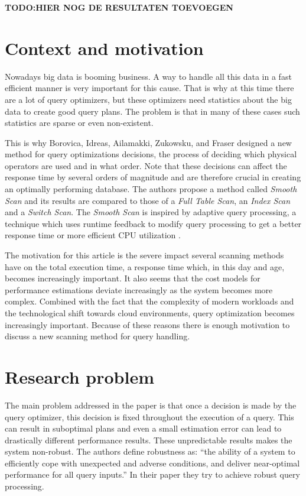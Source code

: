 \documentclass[a4paper,11pt,twoside]{article}
\begin{document}
\textbf{TODO:HIER NOG DE RESULTATEN TOEVOEGEN}

\newpage
\section{Context and motivation}
Nowadays big data is booming business. A way to handle all this data in a fast efficient manner is very important for this cause. That is why at this time there are a lot of query optimizers, but these optimizers need statistics about the big data to create good query plans. The problem is that in many of these cases such statistics are sparse or even non-existent.

This is why Borovica, Idreas, Ailamakki, Zukowsku, and Fraser \cite{smoothscan} designed a new method for query optimizations decisions, the process of deciding which physical operators are used and in what order. Note that these decisions can affect the response time by several orders of magnitude and are therefore crucial in creating an optimally performing database. The authors propose a method called \emph{Smooth Scan} and its results are compared to those of a \emph{Full Table Scan}, an \emph{Index Scan} and a \emph{Switch Scan}. The \emph{Smooth Scan} is inspired by adaptive query processing, a technique which uses runtime feedback to modify query processing to get a better response time or more efficient CPU utilization \cite{query}.

The motivation for this article is the severe impact several scanning methods have on the total execution time, a response time which, in this day and age, becomes increasingly important. It also seems that the cost models for performance estimations deviate increasingly as the system becomes more complex. Combined with the fact that the complexity of modern workloads and the technological shift towards cloud environments, query optimization becomes increasingly important. Because of these reasons there is enough motivation to discuss a new scanning method for query handling.

\section{Research problem}
The main problem addressed in the paper is that once a decision is made by the query optimizer, this decision is fixed throughout the execution of a query. This can result in suboptimal plans and even a small estimation error can lead to drastically different performance results. These unpredictable results makes the system non-robust. The authors define robustness as: ``the ability of a system to efficiently cope with unexpected and adverse conditions, and deliver near-optimal performance for all query inputs.'' \cite{smoothscan} In their paper they try to achieve robust query processing.
\end{document}
